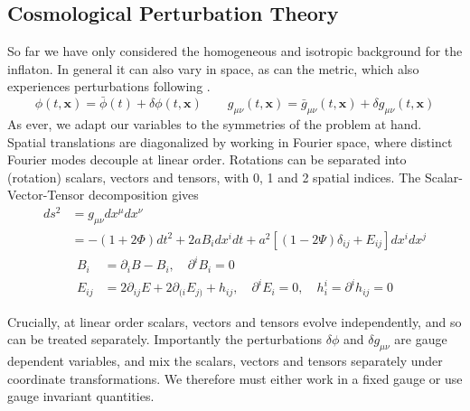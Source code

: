 \documentclass[a4paper,10pt]{article}
\renewcommand{\v}[1]{\mathbf{#1}}
\newcommand{\bphi}{\bar{\phi}}
\begin{document}
\subsection{Cosmological Perturbation Theory}
So far we have only considered the homogeneous and isotropic background for the inflaton. In general it can also vary in space, as can the metric, which also experiences perturbations following \cite{CMBPol}.
\begin{equation}
\phi(t,\v{x}) = \bphi(t) +\delta\phi(t,\v{x}) \qquad g_{\mu\nu}(t,\v{x}) = \bar{g}_{\mu\nu}(t,\v{x}) +\delta g_{\mu\nu}(t,\v{x})
\end{equation}
As ever, we adapt our variables to the symmetries of the problem at hand. Spatial translations are diagonalized by working in Fourier space, where distinct Fourier modes decouple at linear order. Rotations can be separated into (rotation) scalars, vectors and tensors, with 0, 1 and 2 spatial indices. The Scalar-Vector-Tensor decomposition gives
\begin{equation}
\begin{split}
ds^2 &= g_{\mu\nu}dx^\mu dx^\nu\\
&= -(1+2\Phi)dt^2 + 2aB_idx^idt+a^2[(1-2\Psi)\delta_{ij}+E_{ij}]dx^idx^j
\end{split}
\label{metricperturb}
\end{equation}
\begin{equation}
\begin{split}	
B_i &= \partial_i B - B_i, \quad \partial^iB_i=0\\
E_{ij} &= 2\partial_{ij}E + 2\partial_{(i}E_{j)} + h_{ij}, \quad \partial^iE_i=0, \quad h^i_i = \partial^ih_{ij}=0
\end{split}
\end{equation}

Crucially, at linear order  scalars, vectors and tensors evolve independently, and so can be treated separately. Importantly the perturbations $\delta\phi$ and $\delta g_{\mu\nu}$ are gauge dependent variables, and mix the scalars, vectors and tensors separately under coordinate transformations. We therefore must either work in a fixed gauge or use gauge invariant quantities.\\
\end{document}
